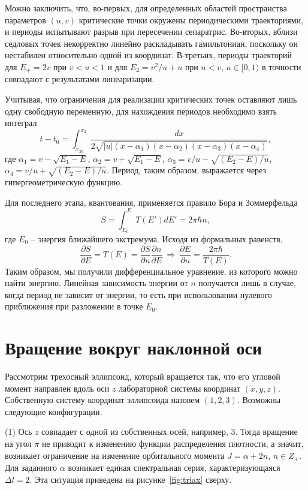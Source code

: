 \documentclass[a4paper, 10pt, twocolumn]{article}
\begin{document}
Можно заключить, что, во-первых, для определенных областей пространства 
параметров $(u,v)$ критические точки окружены периодическими 
траекториями, и периоды испытывают разрыв при пересечении сепаратрис. 
Во-вторых, вблизи седловых точек некорректно линейно раскладывать 
гамильтониан, поскольку он нестабилен относительно одной из координат. 
В-третьих, периоды траекторий для $E_+ = 2v$ при $v < u < 1$ и для $E_2 
= v^2/u + u$ при $u < v$, $u \in [0, 1)$ в точности совпадают 
с результатами линеаризации.

Учитывая, что ограничения для реализации критических точек оставляют 
лишь одну свободную переменную, для нахождения периодов необходимо взять 
интеграл
$$ t \!-\! t_0 =\! \int_{x_{30}}^{x_3} \frac{dx}{2\sqrt{|u| (x \!-\! \alpha_1) (x \!-\! \alpha_2) (x \!-\! \alpha_3) (x \!-\! \alpha_4)}}, $$
где $\alpha_1 = v - \sqrt{E_1 - E}$, $\alpha_2 = v + \sqrt{E_1 - E}$,
$\alpha_3 = v/u - \sqrt{(E_2 - E)/u}$, $\alpha_4 = v/u + \sqrt{(E_2 - E)/u}$.
Период, таким образом, выражается через гипергеометрическую функцию.

Для последнего этапа, квантования, применяется правило Бора 
и Зоммерфельда
$$ S = \int_{E_0}^E T(E') d E' = 2\pi \hbar n, $$
где $E_0$ -- энергия ближайшего экстремума. Исходя из формальных равенств,
$$ \frac{\partial S}{\partial E} = T(E) = \frac{\partial S}{\partial n}
   \frac{\partial n}{\partial E}\ \Rightarrow\ \frac{\partial E}{\partial n} =
	 \frac{2\pi\hbar}{T(E)}. $$
Таким образом, мы получили дифференциальное уравнение, из которого можно 
найти энергию. Линейная зависимость энергии от $n$ получается лишь 
в случае, когда период не зависит от энергии, то есть при использовании 
нулевого приближения при разложении в точке $E_0$.


\section{Вращение вокруг наклонной оси}%

Рассмотрим трехосный эллипсоид, который вращается так, что его угловой 
момент направлен вдоль оси $z$ лабораторной системы координат $(x,y,z)$. 
Собственную систему координат эллипсоида назовем $(1,2,3)$. Возможны 
следующие конфигурации.

(1) Ось $z$ совпадает с одной из собственных осей, например, 3. Тогда 
вращение на угол $\pi$ не приводит к изменению функции распределения 
плотности, а значит, возникает ограничение на изменение орбитального 
момента $J = \alpha + 2n$, $n \in Z_+$. Для заданного $\alpha$ возникает 
единая спектральная серия, характеризующаяся $\Delta l = 2$. Эта 
ситуация приведена на рисунке~\ref{fig:triax} сверху.
\end{document}
